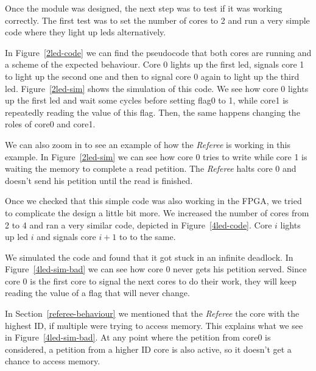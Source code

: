 Once the module was designed, the next step was to test if it was working correctly.
The first test was to set the number of cores to 2 and run a very simple code where they light up leds alternatively.

\label{2led-code}

In Figure~\ref{2led-code} we can find the pseudocode that both cores are running and a scheme of the expected behaviour.
Core 0 lights up the first led, signals core 1 to light up the second one and then to signal core 0 again to light up the third led.
Figure~\ref{2led-sim} shows the simulation of this code.
We see how core 0 lights up the first led and wait some cycles before setting flag0 to 1, while core1 is repeatedly reading the value of this flag.
Then, the same happens changing the roles of core0 and core1.

\label{2led-sim}

We can also zoom in to see an example of how the \textit{Referee} is working in this example. In Figure~\ref{2led-sim} we can see how core 0 tries to write while core 1 is waiting the memory to complete a read petition. 
The \textit{Referee} halts core 0 and doesn't send his petition until the read is finished.

\label{2led-close}

Once we checked that this simple code was also working in the FPGA, we tried to complicate the design a little bit more.
We increased the number of cores from 2 to 4 and ran a very similar code, depicted in Figure~\ref{4led-code}. Core $i$ lights up led $i$ and signals core $i+1$ to to the same.

\label{4led-code}

We simulated the code and found that it got stuck in an infinite deadlock.
In Figure~\ref{4led-sim-bad} we can see how core 0 never gets his petition served.
Since core 0 is the first core to signal the next cores to do their work, they will keep reading the value of a flag that will never change.

\label{4led-sim-bad}

In Section~\ref{referee-behaviour} we mentioned that the \textit{Referee} the core with the highest ID, if multiple were trying to access memory. 
This explains what we see in Figure~\ref{4led-sim-bad}.
At any point where the petition from core0 is considered, a petition from a higher ID core is also active, so it doesn't get a chance to access memory.

